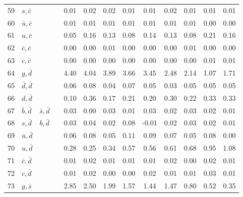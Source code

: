 \begin{tabularx}{\textwidth}{rXXX@{}S@{}S@{}S@{}S@{}S@{}S@{}S@{}S@{}S}
 59 & $s, \bar c$      &                   &                  &  0.01 &  0.02 &  0.02 &  0.01 &  0.01 &  0.02 &  0.01 &  0.01 &  0.01 \\
 60 & $\bar u, \bar c$ &                   &                  &  0.01 &  0.01 &  0.01 &  0.01 &  0.01 &  0.01 &  0.01 &  0.00 &  0.00 \\
 61 & $u, \bar c$      &                   &                  &  0.05 &  0.16 &  0.13 &  0.08 &  0.14 &  0.13 &  0.08 &  0.21 &  0.16 \\
 62 & $\bar c, \bar c$ &                   &                  &  0.00 &  0.00 &  0.01 &  0.00 &  0.00 &  0.00 &  0.01 &  0.00 &  0.00 \\
 63 & $c, \bar c$      &                   &                  &  0.00 &  0.00 &  0.00 &  0.00 &  0.00 &  0.00 &  0.00 &  0.01 &  0.01 \\
 64 & $g, \bar d$      &                   &                  &  4.40 &  4.04 &  3.89 &  3.66 &  3.45 &  2.48 &  2.14 &  1.07 &  1.71 \\
 65 & $\bar d, \bar d$ &                   &                  &  0.06 &  0.08 &  0.04 &  0.07 &  0.05 &  0.03 &  0.05 &  0.05 &  0.05 \\
 66 & $d, \bar d$      &                   &                  &  0.10 &  0.36 &  0.17 &  0.21 &  0.20 &  0.30 &  0.22 &  0.33 &  0.33 \\
 67 & $\bar b, \bar d$ & $\bar s, \bar d$  &                  &  0.03 &  0.00 &  0.03 &  0.01 &  0.03 &  0.02 &  0.03 &  0.02 &  0.01 \\
 68 & $s, \bar d$      & $b, \bar d$       &                  &  0.03 &  0.04 &  0.02 &  0.08 & -0.01 &  0.02 &  0.03 &  0.02 &  0.01 \\
 69 & $\bar u, \bar d$ &                   &                  &  0.06 &  0.08 &  0.05 &  0.11 &  0.09 &  0.07 &  0.05 &  0.08 &  0.00 \\
 70 & $u, \bar d$      &                   &                  &  0.28 &  0.25 &  0.34 &  0.57 &  0.56 &  0.61 &  0.68 &  0.95 &  1.08 \\
 71 & $\bar c, \bar d$ &                   &                  &  0.01 &  0.02 &  0.01 &  0.01 &  0.01 &  0.02 &  0.00 &  0.02 &  0.01 \\
 72 & $c, \bar d$      &                   &                  &  0.01 &  0.02 &  0.00 &  0.00 &  0.02 &  0.01 &  0.01 &  0.03 &  0.01 \\
 73 & $g, \bar s$      &                   &                  &  2.85 &  2.50 &  1.99 &  1.57 &  1.44 &  1.47 &  0.80 &  0.52 &  0.35 \\

\end{tabularx}
